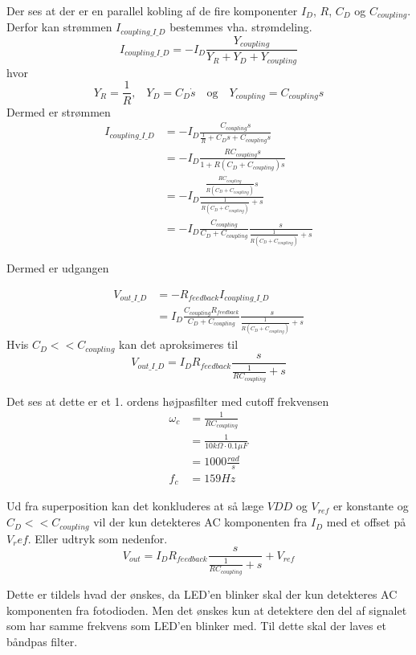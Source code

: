 \documentclass[HardwareDesign/HardwareDesign_main.tex]{subfiles}
\begin{document}
Der ses at der er en parallel kobling af de fire komponenter $I_D$, $R$, $C_D$ og $C_{coupling}$. Derfor kan strømmen $I_{coupling\_I\_D}$ bestemmes vha. strømdeling. 
$$
I_{coupling\_I\_D} = - I_D \frac{Y_{coupling}}{Y_R + Y_D + Y_{coupling}}
$$
hvor
$$
Y_R = \frac{1}{R} \textrm{,} \quad Y_D = C_D \dot s \quad \textrm{og} \quad Y_{coupling} = C_{coupling} s
$$
Dermed er strømmen
\begin{align}
I_{coupling\_I\_D} &= -I_D \frac{C_{coupling} s}{\frac{1}{R} + C_D s + C_{coupling} s}\\
&= - I_D \frac{R C_{coupling} s}{1 + R\left(C_D + C_{coupling} \right)s}\\
&=  - I_D \frac{\frac{R C_{coupling}}{R\left(C_D + C_{coupling} \right)} s}{\frac{1}{R\left(C_D + C_{coupling} \right)} + s}\\
&= - I_D \frac{C_{coupling}}{C_D + C_{coupling}} \frac{s}{\frac{1}{R\left(C_D + C_{coupling} \right)} + s}
\end{align}

Dermed er udgangen

\begin{align}
V_{out\_I\_D} &= -R_{feedback}I_{coupling\_I\_D}\\
&= I_D \frac{C_{coupling}R_{feedback}}{C_D + C_{coupling}} \frac{s}{\frac{1}{R\left(C_D + C_{coupling} \right)} + s}
\end{align}
Hvis $C_D << C_{coupling}$ kan det aproksimeres til
$$V_{out\_I\_D} = I_D R_{feedback} \frac{s}{\frac{1}{R C_{coupling}} + s}$$

Det ses at dette er et 1. ordens højpasfilter med cutoff frekvensen 
\begin{align}
\omega_c &= \frac{1}{RC_{coupling} }\\
&= \frac{1}{10\si{k\Omega} \cdot 0.1\si{\mu F}}\\
&= 1000 \si{\frac{rad}{s}}\\
f_c &= 159 \si{Hz}
\end{align}

Ud fra superposition kan det konkluderes at så læge $VDD$ og $V_{ref}$ er konstante og $C_D << C_{coupling}$ vil der kun detekteres AC komponenten fra $I_D$ med et offset på $V_ref$. Eller udtryk som nedenfor.
$$V_{out} = I_D R_{feedback} \frac{s}{\frac{1}{R C_{coupling}} + s} + V_{ref}$$

Dette er tildels hvad der ønskes, da LED'en blinker skal der kun detekteres AC komponenten fra fotodioden. Men det ønskes kun at detektere den del af signalet som har samme frekvens som LED'en blinker med. Til dette skal der laves et båndpas filter.
\end{document}

